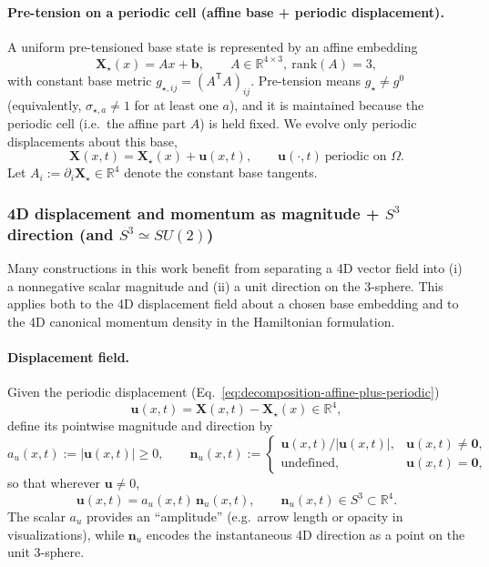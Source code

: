 \paragraph{Pre-tension on a periodic cell (affine base + periodic displacement).}
A uniform pre-tensioned base state is represented by an affine embedding
\begin{equation}
  \mathbf X_\star(x)=A x+\mathbf b,
  \qquad A\in\mathbb R^{4\times 3},\ \mathrm{rank}(A)=3,
  \label{eq:affine-base-embedding}
\end{equation}
with constant base metric $g_{\star,ij}=(A^\mathsf T A)_{ij}$.
Pre-tension means $g_\star\neq g^0$ (equivalently, $\sigma_{\star,a}\neq 1$ for at least one $a$),
and it is maintained because the periodic cell (i.e.\ the affine part $A$) is held fixed.
We evolve only periodic displacements about this base,
\begin{equation}
  \mathbf X(x,t)=\mathbf X_\star(x)+\mathbf u(x,t),
  \qquad \mathbf u(\cdot,t)\ \text{periodic on }\Omega.
  \label{eq:decomposition-affine-plus-periodic}
\end{equation}
Let $A_i:=\partial_i\mathbf X_\star\in\mathbb R^4$ denote the constant base tangents.

\subsubsection{4D displacement and momentum as magnitude + $S^3$ direction (and $S^3\simeq SU(2)$)}
\label{sec:s3-su2-decomposition}

Many constructions in this work benefit from separating a 4D vector
field into (i) a nonnegative scalar magnitude and (ii) a unit direction on the
3-sphere. This applies both to the 4D displacement field about a chosen base
embedding and to the 4D canonical momentum density in the Hamiltonian
formulation.

\paragraph{Displacement field.}
Given the periodic displacement (Eq.~\eqref{eq:decomposition-affine-plus-periodic})
\[
\mathbf u(x,t)=\mathbf X(x,t)-\mathbf X_\star(x)\in\mathbb R^4,
\]
define its pointwise magnitude and direction by
\begin{equation}
  a_u(x,t) := |\mathbf u(x,t)| \ge 0,
  \qquad
  \mathbf n_u(x,t) :=
  \begin{cases}
    \mathbf u(x,t)/|\mathbf u(x,t)|, & \mathbf u(x,t)\neq \mathbf 0,\\
    \text{undefined}, & \mathbf u(x,t)=\mathbf 0,
  \end{cases}
  \label{eq:xi-amplitude-direction}
\end{equation}
so that wherever $\mathbf u\neq 0$,
\begin{equation}
  \mathbf u(x,t) = a_u(x,t)\,\mathbf n_u(x,t),
  \qquad
  \mathbf n_u(x,t)\in S^3\subset\mathbb R^4.
  \label{eq:xi-factorization}
\end{equation}
The scalar $a_u$ provides an ``amplitude'' (e.g.\ arrow length or opacity in
visualizations), while $\mathbf n_u$ encodes the instantaneous 4D direction as
a point on the unit 3-sphere.

